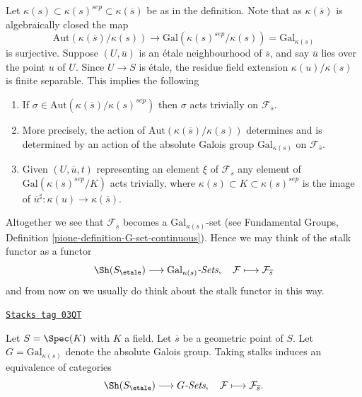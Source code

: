 Let $\kappa(s) \subset \kappa(s)^{sep} \subset \kappa(\overline{s})$
be as in the definition. Note that as $\kappa(\overline{s})$ is algebraically
closed the map
$$
\text{Aut}(\kappa(\overline{s})/\kappa(s))
\longrightarrow
\text{Gal}(\kappa(s)^{sep}/\kappa(s)) = \text{Gal}_{\kappa(s)}
$$
is surjective. Suppose $(U, \overline{u})$ is an
\'etale neighbourhood of $\overline{s}$, and say $\overline{u}$ lies over
the point $u$ of $U$. Since $U \to S$ is \'etale, the residue field extension
$\kappa(u)/\kappa(s)$ is finite separable.
This implies the following
\begin{enumerate}
\item If $\sigma \in \text{Aut}(\kappa(\overline{s})/\kappa(s)^{sep})$
then $\sigma$ acts trivially on $\mathcal{F}_{\overline{s}}$.
\item More precisely, the action of
$\text{Aut}(\kappa(\overline{s})/\kappa(s))$
determines and is determined by an action of the absolute Galois group
$\text{Gal}_{\kappa(s)}$ on $\mathcal{F}_{\overline{s}}$.
\item Given $(U, \overline{u}, t)$ representing an element $\xi$ of
$\mathcal{F}_{\overline{s}}$ any element of
$\text{Gal}(\kappa(s)^{sep}/K)$ acts trivially, where
$\kappa(s) \subset K \subset \kappa(s)^{sep}$ is the image of
$\overline{u}^\sharp : \kappa(u) \to \kappa(\overline{s})$.
\end{enumerate}
Altogether we see that $\mathcal{F}_{\overline{s}}$ becomes a
$\text{Gal}_{\kappa(s)}$-set (see
Fundamental Groups, Definition \ref{pione-definition-G-set-continuous}).
Hence we may think of the stalk functor as a functor
$$
\Sh(S_\etale) \longrightarrow
\text{Gal}_{\kappa(s)}\textit{-Sets},
\quad
\mathcal{F} \longmapsto \mathcal{F}_{\overline{s}}
$$
and from now on we usually do think about the stalk functor in this way.

\begin{theorem}
\label{etale-cohomology-theorem-equivalence-sheaves-point}
\href{https://stacks.math.columbia.edu/tag/03QT}{\texttt{Stacks tag 03QT}}

Let $S = \Spec(K)$ with $K$ a field.
Let $\overline{s}$ be a geometric point of $S$.
Let $G = \text{Gal}_{\kappa(s)}$ denote the absolute Galois group.
Taking stalks induces an equivalence of categories
$$
\Sh(S_\etale) \longrightarrow G\textit{-Sets},
\quad
\mathcal{F} \longmapsto \mathcal{F}_{\overline{s}}.
$$
\end{theorem}

